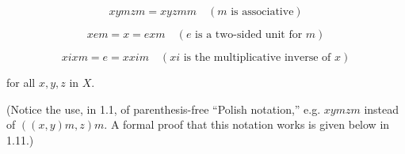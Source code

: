 $$xymzm = xyzmm \quad (m \text{ is associative})$$

$$xem = x = exm \quad (e \text{ is a two-sided unit for } m)$$

$$xixm = e = xxim \quad (xi \text{ is the multiplicative inverse of } x)$$

for all $x, y, z$ in $X$.

(Notice the use, in 1.1, of parenthesis-free “Polish notation,” e.g. $xymzm$ instead of $((x, y)m, z)m$. A formal proof that this notation works is given below in 1.11.)